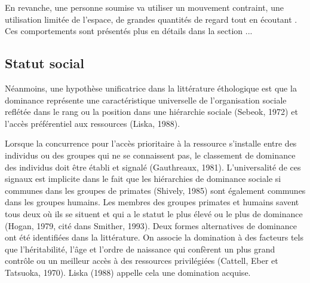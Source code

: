 En revanche, une personne soumise va utiliser un mouvement contraint, une utilisation limitée de l'espace, de grandes quantités de regard tout en écoutant  \cite{burgoon1998nature}. Ces comportements sont présentés plus en détails dans la section ... 


\subsection{Statut social}
Néanmoins, une hypothèse unificatrice dans la littérature éthologique est que la dominance représente une caractéristique universelle de l'organisation sociale reflétée dans le rang ou la position dans une hiérarchie sociale (Sebeok, 1972) et l'accès préférentiel aux ressources (Liska, 1988).

Lorsque la concurrence pour l'accès prioritaire à la ressource s'installe entre des individus ou des groupes qui ne se connaissent pas, le classement de dominance des individus doit être établi et signalé (Gauthreaux, 1981). L'universalité de ces signaux est implicite dans le fait que les hiérarchies de dominance sociale si communes dans les groupes de primates (Shively, 1985) sont également communes dans les groupes humains.
Les membres des groupes primates et humains savent tous deux où ils se situent et qui a le statut le plus élevé ou le plus de dominance (Hogan, 1979, cité dans Smither, 1993).
Deux formes alternatives de dominance ont été identifiées dans la littérature. On associe la domination à des facteurs tels que l'héritabilité, l'âge et l'ordre de naissance qui confèrent un plus grand contrôle ou un meilleur accès à des ressources privilégiées (Cattell, Eber et Tatsuoka, 1970). Liska (1988) appelle cela une domination acquise.

